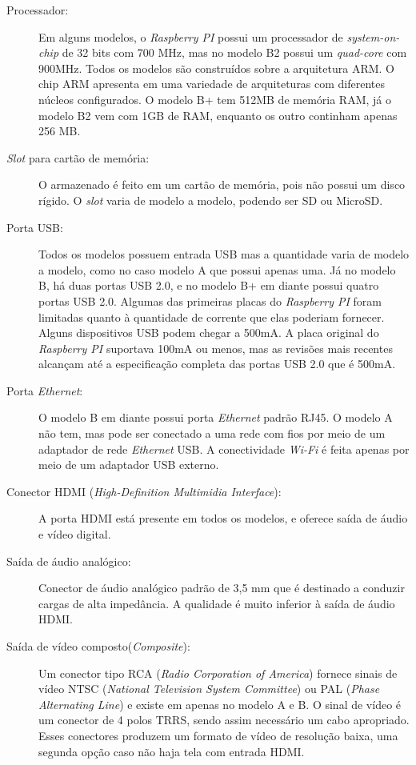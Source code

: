 \documentclass[
	12pt,				%
	openright,			%
	twoside,			%
	a4paper,			%
	chapter=TITLE,		%
	english,			%
	brazil				%
	]{abntex2}
\begin{document}
\begin{description}

\item[Processador:]
Em alguns modelos, o \textit{Raspberry PI} possui um processador de \textit{system-on-chip} de 32 bits com 700 MHz, mas no modelo B2 possui um \textit{quad-core} com 900MHz. Todos os modelos são construídos sobre a arquitetura ARM. O chip ARM apresenta em uma variedade de arquiteturas com diferentes núcleos configurados. O modelo B+ tem 512MB de memória RAM, já o modelo B2 vem com 1GB de RAM, enquanto os outro continham apenas 256 MB.
 
\item[\textit{Slot} para cartão de memória:]
O armazenado é feito em um cartão de memória, pois não possui um disco rígido. O \textit{slot} varia de modelo a modelo, podendo ser SD ou MicroSD.

\item[Porta USB:]
Todos os modelos possuem entrada USB mas a quantidade varia de modelo a modelo, como no caso modelo A que possui apenas uma. Já no modelo B, há duas portas USB 2.0, e no modelo B+ em diante possui quatro portas USB 2.0. Algumas das primeiras placas do \textit{Raspberry PI} foram limitadas quanto à quantidade de corrente que elas poderiam fornecer. Alguns dispositivos USB podem chegar a 500mA. A placa original do \textit{Raspberry PI} suportava 100mA ou menos, mas as revisões mais recentes alcançam até a especificação completa das portas USB 2.0 que é 500mA.

\item[Porta \textit{Ethernet}:] 
O modelo B em diante possui porta \textit{Ethernet} padrão RJ45. O modelo A não tem, mas pode ser conectado a uma rede com fios por meio de um adaptador de rede \textit{Ethernet} USB. A conectividade \textit{Wi-Fi} é feita apenas por meio de um adaptador USB externo.

\item[Conector HDMI (\textit{High-Definition Multimidia Interface}):] 
A porta HDMI está presente em todos os modelos, e oferece saída de áudio e vídeo digital.

\item[Saída de áudio analógico:]
Conector de áudio analógico padrão de 3,5 mm que é destinado a conduzir cargas de alta impedância. A qualidade é muito inferior à saída de áudio HDMI.

\item[Saída de vídeo composto(\textit{Composite}):]
Um conector tipo RCA (\textit{Radio Corporation of America}) fornece sinais de vídeo NTSC (\textit{National Television System Committee}) ou PAL (\textit{Phase Alternating Line}) e existe em apenas no modelo A e B. O sinal de vídeo é um conector de 4 polos TRRS, sendo assim necessário um cabo apropriado. Esses conectores produzem um formato de vídeo de resolução baixa, uma segunda opção caso não haja tela com entrada HDMI.


\end{description}
\end{document}
